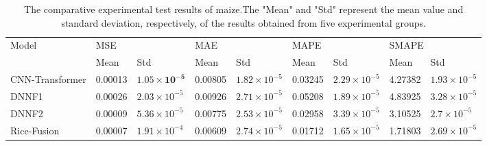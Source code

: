 \documentclass[acmsmall,manuscript, screen, review]{acmart}
\begin{document}
\begin{table}[htbp]
  \centering
  \caption{The comparative experimental test results of maize.The "Mean" and "Std" represent the mean value and standard deviation, respectively, of the results obtained from five experimental groups.}
    \begin{tabular}{lllllllll}
    \toprule
    \multirow{2}[4]{*}{Model} & \multicolumn{2}{l}{MSE} & \multicolumn{2}{l}{MAE} & \multicolumn{2}{l}{MAPE} & \multicolumn{2}{l}{SMAPE} \\
\cmidrule{2-9}          & Mean  & Std   & Mean  & Std   & Mean  & Std   & Mean  & Std \\
    \midrule
    CNN-Transformer & 0.00013 & \begin{math}\mathbf{1.05\times 10^{-5}}\end{math} & 0.00805 & \begin{math}1.82\times 10^{-5}\end{math} & 0.03245 & \begin{math}2.29\times 10^{-5}\end{math} & 4.27382 & \begin{math}1.93\times 10^{-5}\end{math} \\
    DNNF1 & 0.00026 & \begin{math}2.03\times 10^{-5}\end{math} & 0.00926 & \begin{math}2.71\times 10^{-5}\end{math} & 0.05208 & \begin{math}1.89\times 10^{-5}\end{math} & 4.83925 & \begin{math}3.28\times 10^{-5}\end{math} \\
    DNNF2 & 0.00009 & \begin{math}5.36\times 10^{-5}\end{math} & 0.00775 & \begin{math}2.53\times 10^{-5}\end{math} & 0.02958 & \begin{math}3.39\times 10^{-5}\end{math} & 3.10525 & \begin{math}2.7\times 10^{-5}\end{math} \\
    Rice-Fusion & 0.00007 & \begin{math}1.91\times 10^{-4}\end{math} & 0.00609 & \begin{math}2.74\times 10^{-5}\end{math} & 0.01712 & \begin{math}1.65\times 10^{-5}\end{math} & 1.71803 & \begin{math}2.69\times 10^{-5}\end{math} \\

\end{tabular}
\end{table}
\end{document}
